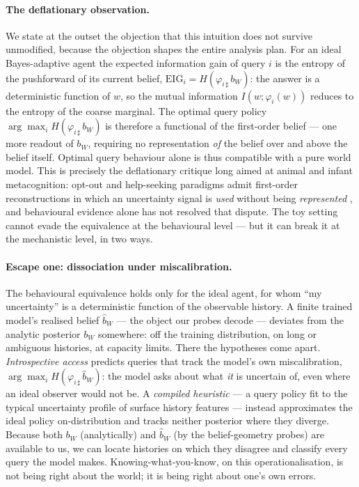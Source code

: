 \paragraph{The deflationary observation.} We state at the outset the objection
that this intuition does not survive unmodified, because the objection shapes
the entire analysis plan. For an ideal Bayes-adaptive agent the expected
information gain of query $i$ is the entropy of the pushforward of its current
belief, $\mathrm{EIG}_i = H(\varphi_{i\,\sharp}\, b_W)$: the answer is a
deterministic function of $w$, so the mutual information $I(w;\varphi_i(w))$
reduces to the entropy of the coarse marginal. The optimal query policy
$\arg\max_i H(\varphi_{i\,\sharp}\, b_W)$ is therefore a functional of the
first-order belief --- one more readout of $b_W$, requiring no representation
\emph{of} the belief over and above the belief itself. Optimal query behaviour
alone is thus compatible with a pure world model. This is precisely the
deflationary critique long aimed at animal and infant metacognition: opt-out
and help-seeking paradigms \citep{hampton2001monkeys,goupil2016infants} admit
first-order reconstructions in which an uncertainty signal is \emph{used}
without being \emph{represented} \citep{carruthers2008skeptical}, and
behavioural evidence alone has not resolved that dispute. The toy setting
cannot evade the equivalence at the behavioural level --- but it can break it
at the mechanistic level, in two ways.

\paragraph{Escape one: dissociation under miscalibration.} The behavioural
equivalence holds only for the ideal agent, for whom ``my uncertainty'' is a
deterministic function of the observable history. A finite trained model's
realised belief $\hat b_W$ --- the object our probes decode --- deviates from
the analytic posterior $b_W$ somewhere: off the training distribution, on long
or ambiguous histories, at capacity limits. There the hypotheses come apart.
\emph{Introspective access} predicts queries that track the model's own
miscalibration, $\arg\max_i H(\varphi_{i\,\sharp}\, \hat b_W)$: the model asks
about what \emph{it} is uncertain of, even where an ideal observer would not
be. A \emph{compiled heuristic} --- a query policy fit to the typical
uncertainty profile of surface history features --- instead approximates the
ideal policy on-distribution and tracks neither posterior where they diverge.
Because both $b_W$ (analytically) and $\hat b_W$ (by the belief-geometry
probes) are available to us, we can locate histories on which they disagree and
classify every query the model makes. Knowing-what-you-know, on this
operationalisation, is not being right about the world; it is being right about
one's own errors.

